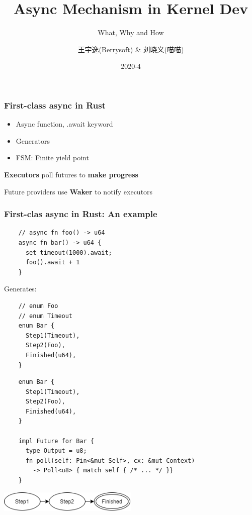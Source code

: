 \documentclass[UTF-8]{ctexbeamer}
\title{Async Mechanism in Kernel Dev}
\subtitle{What, Why and How}
\author{王宇逸(Berrysoft) \& 刘晓义(喵喵)}
\date{2020-4}
\begin{document}
\begin{frame}
  \titlepage
\end{frame}

\begin{frame}
  \frametitle{First-class async in Rust}

  \begin{itemize}
    \item Async function, .await keyword
    \item Generators
    \item FSM: Finite yield point
  \end{itemize}

  \pause

  \vspace{1em}

  \textbf{Executors} poll futures to \textbf{make progress}

  Future providers use \textbf{Waker} to notify executors
\end{frame}

\begin{frame}[fragile]
  \frametitle{First-clas async in Rust: An example}

  \begin{verbatim}
    // async fn foo() -> u64
    async fn bar() -> u64 {
      set_timeout(1000).await;
      foo().await + 1
    }
  \end{verbatim}
  
  \pause
  \vspace{1em}
  Generates:
  \vspace{1em}

  \begin{verbatim}
    // enum Foo
    // enum Timeout
    enum Bar {
      Step1(Timeout),
      Step2(Foo),
      Finished(u64),
    }
  \end{verbatim}
\end{frame}

\begin{frame}[fragile]
  \begin{verbatim}
    enum Bar {
      Step1(Timeout),
      Step2(Foo),
      Finished(u64),
    }

    impl Future for Bar {
      type Output = u8;
      fn poll(self: Pin<&mut Self>, cx: &mut Context)
        -> Poll<u8> { match self { /* ... */ }}
    }
  \end{verbatim}

  \vspace{1em}

  {
    \centering
    \includegraphics[width=0.5\textwidth]{assets/fsm.png}
  }
\end{frame}
\end{document}
